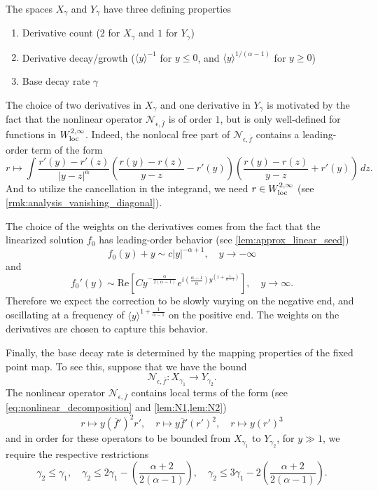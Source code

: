 \documentclass[11pt]{amsart}
\theoremstyle{definition}
\theoremstyle{remark}
\numberwithin{equation}{section}
\newcommand{\mc}[1]{\mathcal{#1}}
\newcommand{\ov}[1]{\overline{#1}}
\newcommand{\ang}[1]{\langle #1 \rangle}
\begin{document}
The spaces $X_\gamma$ and $Y_\gamma$ have three defining properties
\begin{enumerate}
    \item Derivative count ($2$ for $X_\gamma$ and $1$ for $Y_\gamma$)
    \item Derivative decay/growth ($\ang{y}^{-1}$ for $y \leq 0$, and $\ang{y}^{1/(\alpha - 1)}$ for $y \geq 0$)
    \item Base decay rate $\gamma$
\end{enumerate}

The choice of two derivatives in $X_\gamma$ and one derivative in $Y_\gamma$ is motivated by the fact that the nonlinear operator $\mc{N}_{\epsilon, \ov{f}}$ is of order $1$, but is only well-defined for functions in $W^{2,\infty}_{\textup{loc}}$. Indeed, the nonlocal free part of $\mc{N}_{\epsilon, \ov{f}}$ contains a leading-order term of the form 
\[r \mapsto \int \frac{r'(y) - r'(z)}{|y - z|^\alpha}\left(\frac{r(y) - r(z)}{y - z} - r'(y)\right)\left(\frac{r(y) - r(z)}{y - z} + r'(y)\right) \, dz.\]
And to utilize the cancellation in the integrand, we need $r \in W^{2,\infty}_{\textup{loc}}$ (see \cref{rmk:analysis_vanishing_diagonal}). \par
The choice of the weights on the derivatives comes from the fact that the linearized solution $f_0$ has leading-order behavior (see \cref{lem:approx_linear_seed})
\[f_0(y) + y \sim c|y|^{-\alpha + 1}, \quad y \to -\infty\]
and 
\[f_0'(y) \sim \text{Re}\left[ C y^{- \frac{\alpha}{2(\alpha - 1)}}e^{i \left(\frac{\alpha - 1}{\alpha}\right) y^{\left(1 + \frac{1}{\alpha - 1}\right)}} \right], \quad y \to \infty.\]
Therefore we expect the correction to be slowly varying on the negative end, and oscillating at a frequency of $\ang{y}^{1 + \frac{1}{\alpha - 1}}$ on the positive end. The weights on the derivatives are chosen to capture this behavior. \par
Finally, the base decay rate is determined by the mapping properties of the fixed point map. To see this, suppose that we have the bound
\[\mc{N}_{\epsilon, \ov{f}} : X_{\gamma_1} \to Y_{\gamma_2}.\]
The nonlinear operator $\mc{N}_{\epsilon, \ov{f}}$ contains local terms of the form (see \eqref{eq:nonlinear_decomposition} and \cref{lem:N1,lem:N2}) 
\[r \mapsto y(\overline f')^2r' , \quad r \mapsto y\overline f'(r')^2, \quad r \mapsto y(r')^3\]
and in order for these operators to be bounded from $X_{\gamma_1}$ to $Y_{\gamma_2}$, for $y \gg 1$, we require the respective restrictions
\[\gamma_2 \leq \gamma_1, \quad \gamma_2 \leq 2\gamma_1 - \left(\frac{\alpha + 2}{2(\alpha - 1)}\right), \quad \gamma_2 \leq 3\gamma_1 - 2\left(\frac{\alpha + 2}{2(\alpha - 1)}\right).\]
\end{document}
